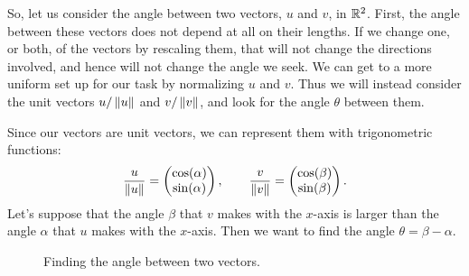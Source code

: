 \documentclass[00-livre-main.tex]{subfiles}
\begin{document}
So, let us consider the angle between two vectors, $u$ and $v$, in $\mathbb{R}^2$. 
First, the angle between these vectors does not depend at all on their lengths. 
If we change one, or both, of the vectors by rescaling them, that will not change the directions involved, and hence will not change the angle we seek. 
We can get to a more uniform set up for our task by normalizing $u$ and $v$. 
Thus we will instead consider the unit vectors $u/\left\|u\right\|$ and $v/\left\|v\right\|$, and look for the angle $\theta$ between them.

Since our vectors are unit vectors, we can represent them with trigonometric functions:
\[
\frac{u}{\left\|u\right\|} = \begin{pmatrix} \cos(\alpha)\\ \sin(\alpha) \end{pmatrix}, \qquad
\frac{v}{\left\|v\right\|} = \begin{pmatrix} \cos(\beta)\\ \sin(\beta) \end{pmatrix}.
\]
Let's suppose that the angle $\beta$ that $v$ makes with the $x$-axis is larger than the angle $\alpha$ that $u$ makes with the $x$-axis. Then we want to find the angle $\theta = \beta-\alpha$. 

\begin{figure}[h]
\centering
{}
\caption{Finding the angle between two vectors.}
\label{fig:angle-computation}
\end{figure}
\end{document}
